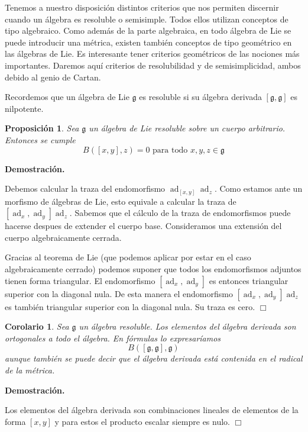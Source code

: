\documentclass[a4paper,draft,12pt]{scrartcl}
\newtheorem{propo}[teo]{Proposición}%
\newtheorem{cor}[teo]{Corolario}%
\newcommand{\dem}{\noindent \textbf{Demostración. }\vspace{0.3 cm}}%
\newcommand{\g}{\mathfrak{g}}%
\newcommand{\fin}{ $\Box $ \vspace{0.4 cm}}
\DeclareMathOperator{\ad}{ad}  %
\begin{document}
 Tenemos a nuestro disposición distintos criterios que nos permiten discernir cuando un álgebra es resoluble o semisimple.  Todos ellos utilizan conceptos de tipo algebraico.  Como además de la parte algebraica, en todo álgebra de Lie se puede introducir una métrica, existen también conceptos de tipo geométrico en las álgebras de Lie.  Es interesante tener criterios geométricos de las nociones más importantes.  Daremos aquí criterios de resolubilidad y de semisimplicidad, ambos debido al genio de Cartan.
 
 Recordemos que un álgebra de Lie $\g$ es resoluble si su álgebra derivada $[\g,\g]$ es nilpotente.
 
 \begin{propo}
 
 Sea $\g$ un álgebra de Lie resoluble sobre un cuerpo arbitrario.  Entonces se cumple
 $$
 B([x,y],z)=0 \text{ para todo } x,y,z \in \g
 $$
 
 \end{propo}
 
 \dem
 
 Debemos calcular la traza del endomorfismo $\ad_{[x,y]}\ad_z$.  Como estamos ante un morfismo de álgebras de Lie, esto equivale a calcular la traza de $[\ad_x,\ad_y]\ad_z$.  Sabemos que el cálculo de la traza de endomorfismos puede hacerse despues de extender el cuerpo base.  Consideramos una extensión del cuerpo algebraicamente cerrada.
 
 Gracias al teorema de Lie (que podemos aplicar por estar en el caso algebraicamente cerrado) podemos suponer que todos los endomorfismos adjuntos tienen forma triangular.  El endomorfismo $[\ad_x,\ad_y]$ es entonces triangular superior con la diagonal nula.  De esta manera el endomorfismo
 $[\ad_x,\ad_y]\ad_z$ es también triangular superior con la diagonal nula.  Su traza es cero.  \fin
 
 \begin{cor}
 
 Sea $\g$ un álgebra resoluble. 
 Los elementos del álgebra derivada son ortogonales a todo el álgebra.  En fórmulas lo expresaríamos
 $$
 B([\g,\g], \g)
 $$
 aunque también se puede decir que el álgebra derivada está contenida en el radical de la métrica.
 
 
 \end{cor}
 
  \dem
 
 
 Los elementos del álgebra derivada son combinaciones lineales de elementos de la forma $[x,y]$ y para estos el producto escalar siempre es nulo.  \fin
 
\end{document}
